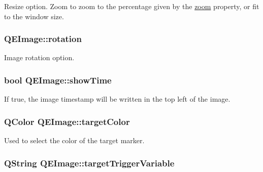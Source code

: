 \label{classQEImage_a04b44c02ff4adaf1d2980af059a91610}
Resize option. Zoom to zoom to the percentage given by the \hyperlink{classQEImage_acc75dbfecaa2e75d9bcf7c11384f3465}{zoom} property, or fit to the window size. \hypertarget{classQEImage_abf8684a4faa9c5de9e85e760894ea463}{
\subsubsection[{rotation}]{ QEImage::rotation}}
\label{classQEImage_abf8684a4faa9c5de9e85e760894ea463}
Image rotation option. \hypertarget{classQEImage_a51abf900097601e100eb03060ca173dc}{
\subsubsection[{showTime}]{\setlength{\rightskip}{0pt plus 5cm}bool QEImage::showTime}}
\label{classQEImage_a51abf900097601e100eb03060ca173dc}
If true, the image timestamp will be written in the top left of the image. \hypertarget{classQEImage_a1665fe2a8c463babc9045f3470d0b161}{
\subsubsection[{targetColor}]{\setlength{\rightskip}{0pt plus 5cm}QColor QEImage::targetColor}}
\label{classQEImage_a1665fe2a8c463babc9045f3470d0b161}
Used to select the color of the target marker. \hypertarget{classQEImage_afa8ff630ef168bfa3db1c496f0957497}{
\subsubsection[{targetTriggerVariable}]{\setlength{\rightskip}{0pt plus 5cm}QString QEImage::targetTriggerVariable}}

